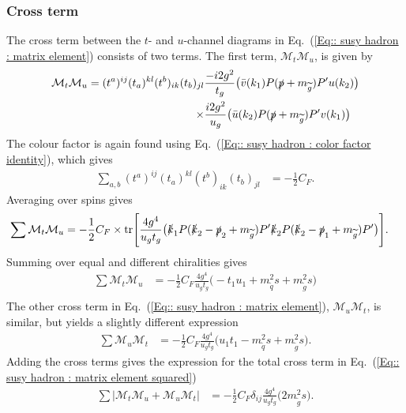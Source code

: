\documentclass[twoside,english]{uiofysmaster}
\begin{document}
{\subsubsection{Cross term}
The cross term between the $t$- and $u$-channel diagrams in Eq.~(\ref{Eq:: susy hadron : matrix element}) consists of two terms. The first term, $\mathcal{M}_t \mathcal{M}_u$, is given by
\begin{align*}
\mathcal{M}_t \mathcal{M}_u = (t^a)^{ij}(t_a)^{kl}(t^b)_{ik}(t_b)_{jl} &\frac{-i 2 g^2}{t_g}\big( \bar{v} (k_1)  P (\slashed{p} + m_{\widetilde{g}}) P'u(k_2) \big) \\ \times& \frac{i 2 g^2}{u_g} \big( \bar{u} (k_2)  P (\slashed{p} + m_{\widetilde{g}}) P' v(k_1) \big)\\
\end{align*}
The colour factor is again found using Eq.~(\ref{Eq:: susy hadron : color factor identity}), which gives
\begin{align*}
\sum_{a,b}(t^a)^{ij}(t_a)^{kl}(t^b)_{ik}(t_b)_{jl} 
 &= - \frac{1}{2}C_F.
\end{align*}
Averaging over spins gives
\begin{align*}
\sum \mathcal{M}_t \mathcal{M}_u &= - \frac{1}{2}C_F \times \text{tr}\Bigg[ \frac{4 g^4}{u_gt_g}\big( \slashed{k}_1   P (\slashed{k}_2 - \slashed{p}_2 + m_{\widetilde{g}}) P'\slashed{k}_2  P (\slashed{k}_2 -\slashed{p}_1 + m_{\widetilde{g}}) P' \big) \Bigg].
\end{align*}
Summing over equal and different chiralities gives
\begin{align*}
\sum \mathcal{M}_t \mathcal{M}_u 
  &= - \frac{1}{2}C_F  \frac{4 g^4}{u_gt_g} \big(
  -   t_1 u_1 + m_{\widetilde{q}}^2 s 
+  m_{\widetilde{g}}^2 s
  \big)\\
\end{align*}
The other cross term in Eq.~(\ref{Eq:: susy hadron : matrix element}),  $\mathcal{M}_u \mathcal{M}_t$, is similar, but yields a slightly different expression
\begin{align*}
\sum \mathcal{M}_u \mathcal{M}_t
  &= - \frac{1}{2}C_F  \frac{4 g^4}{u_gt_g} \big(
u_1t_1- m_{\widetilde{q}}^2s + m_{\widetilde{g}}^2s
  \big).
\end{align*}
Adding the cross terms gives the expression for the total cross term in Eq.~(\ref{Eq:: susy hadron : matrix element squared})
\begin{align*}
\sum |\mathcal{M}_t \mathcal{M}_u + \mathcal{M}_u \mathcal{M}_t| &= - \frac{1}{2}C_F \delta_{ij}  \frac{4 g^4}{u_gt_g} \big(2 m_{\widetilde{g}}^2s   \big).
\end{align*}


}
\end{document}
